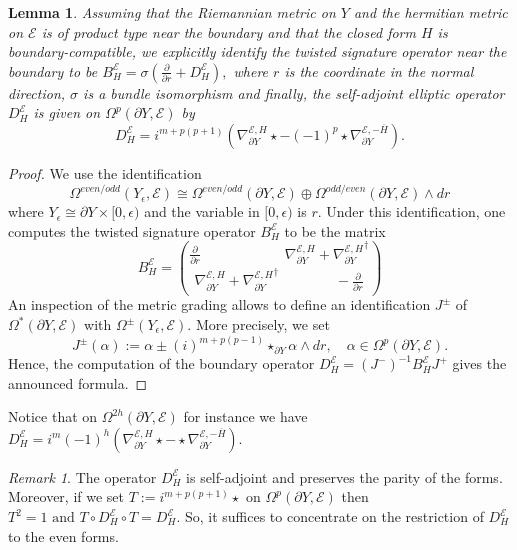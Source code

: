 \documentclass[12pt]{amsart}
\theoremstyle{plain}
\newtheorem{lemma}[theorem]{Lemma}
\theoremstyle{definition}
\theoremstyle{remark}
\newtheorem{remark}[theorem]{Remark}
\begin{document}
\begin{lemma}\label{lem:bdry-iden}
Assuming that the 
Riemannian metric on $Y$ and the hermitian metric on ${\mathcal E}$ is of product type near the boundary {{and that the closed form $H$ is  boundary-compatible}},
we explicitly identify 
the twisted signature operator near the boundary
to be 
$B^{\mathcal E}_H = \sigma\left(\frac{\partial}{\partial r} + D^{\mathcal E}_H \right),$ where 
$r$ is the coordinate in the normal direction, $\sigma$ is a bundle isomorphism and 
finally, the self-adjoint elliptic operator {{$D^{\mathcal E}_H$ is given on 
$\Omega^{p}(\partial Y, {\mathcal E})$ by }}
$$
D^{\mathcal E}_H = i^{m+{{p(p+1)}}} ( \nabla^{{\mathcal E}, H}_{\partial Y} \star - (-1)^p \star \nabla^{{\mathcal E}, -\overline H}_{\partial Y}).
$$
\end{lemma}

\begin{proof}
{{We use the identification}}
 $$
{{ \Omega^{even/odd}(Y_\epsilon, {\mathcal E}) \cong \Omega^{even/odd}(\partial Y, {\mathcal E}) \oplus 
\Omega^{odd/even}(\partial Y, {\mathcal E}) \wedge dr}}
$$
 {{where $Y_\epsilon \cong \partial Y \times [0, \epsilon)$
 and the variable
in $ [0, \epsilon)$ is $r$.  Under this identification, one computes the twisted signature operator $B^{\mathcal E}_H$ 
 to be the matrix}}
$$
B^{\mathcal E}_H = {\frac{\partial}{\partial r} \qquad \qquad \qquad \nabla^{{\mathcal E}, H}_{\partial Y} + {\nabla^{{\mathcal E}, H}_{\partial Y}}^\dagger
 \choose \nabla^{{\mathcal E}, H}_{\partial Y} + {\nabla^{{\mathcal E}, H}_{\partial Y}}^\dagger \qquad\qquad -\frac{\partial}{\partial r} }
$$
{{An inspection of the metric grading allows to define an identification $J^\pm$ of $\Omega^{*} (\partial Y, {\mathcal E})$ with $\Omega^{\pm}(Y_\epsilon, {\mathcal E})$. More precisely, we set}}
$$
{{J^\pm  (\alpha) := \alpha \pm (i)^{m+p(p-1)} \star_{\partial Y} \alpha \wedge dr, \quad \alpha\in \Omega^{p} (\partial Y, {\mathcal E}).}}
$$
{{Hence, the  computation of the boundary operator $D^{\mathcal E}_H={{(J^-)^{-1} B^{\mathcal E}_H J^+}}$ gives the announced formula.}}
\end{proof}
{{Notice that on $\Omega^{2h}(\partial Y, {\mathcal E})$ for instance we have $
D^{\mathcal E}_H = i^m(-1)^{h} (\nabla^{{\mathcal E}, H}_{\partial Y} \star - \star \nabla^{{\mathcal E}, -{\overline H}}_{\partial Y} ).$ 
}}

\begin{remark}
{{The operator $D_H^{\mathcal E}$ is self-adjoint and preserves the parity of the forms. Moreover, if we set $T:=i^{m+p(p+1)} \star$ on $\Omega^p (\partial Y, {\mathcal E})$ then
$
T^2= 1 \text { and } T\circ D_H^{\mathcal E}\circ  T = D_H^{\mathcal E}.
$ 
So, it suffices to concentrate on the restriction of $D_H^{\mathcal E}$ to the even forms.}}
\end{remark}
\end{document}
